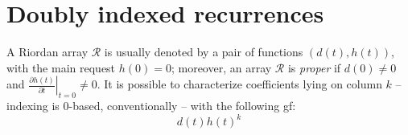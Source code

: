 
\chapter{Doubly indexed recurrences}


A Riordan array $\mathcal{R}$ is usually denoted by a pair
of functions $(d(t), h(t))$, with the main request $h(0)=0$; 
moreover, an array $\mathcal{R}$ is \emph{proper} if $d(0)\neq 0$
and $\left.\frac{\partial h(t)}{\partial t}\right|_{t=0}\neq0$.
It is possible to characterize coefficients lying on column $k$ 
-- indexing is $0$-based, conventionally -- with the following
gf:
\begin{displaymath}
    d(t)h(t)^{k}
\end{displaymath}

